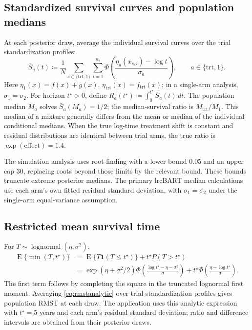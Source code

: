 \documentclass[11pt]{article}
\newcommand{\E}{\operatorname{E}}
\newcommand{\ind}{\mathbf{1}}
\theoremstyle{remark}\newtheorem{remark}{Remark}[section]
\begin{document}
\subsection{Standardized survival curves and population medians}\label{sec:D.3}
At each posterior draw, average the individual survival curves over the trial standardization profiles:
\begin{equation}
\bar S_a(t)\coloneqq \frac{1}N\sum_{s\in\{\mathrm{trt},1\}}\sum_{i=1}^{n_s}\Phi\left(\frac{\eta_a(x_{s,i})-\log t}{\sigma_a}\right),\qquad a\in\{\mathrm{trt},1\}.
\end{equation}
Here $\eta_{1}(x)=f(x)+g(x)$, $\eta_{\mathrm{trt}}(x)=f_{\mathrm{trt}}(x)$; in a single-arm analysis, $\sigma_{1}=\sigma_{2}$. For horizon $t^\star>0$, define $R_a(t^\star)\coloneqq\int_0^{t^\star}\bar S_a(t)\,dt$. The population median $M_a$ solves $\bar S_a(M_a)=1/2$; the median-survival ratio is $M_{\mathrm{trt}}/M_{1}$. This median of a mixture generally differs from the mean or median of the individual conditional medians. When the true log-time treatment shift is constant and residual distributions are identical between trial arms, the true ratio is $\exp(\mathrm{effect})=1.4$.

The simulation analysis uses root-finding with a lower bound 0.05 and an upper cap 30, replacing roots beyond those limits by the relevant bound. These bounds truncate extreme posterior medians. The primary lrcBART median calculations use each arm's own fitted residual standard deviation, with $\sigma_{1}=\sigma_{2}$ under the single-arm equal-variance assumption.

\subsection{Restricted mean survival time}\label{sec:D.4}
For $T\sim\operatorname{lognormal}(\eta,\sigma^2)$,
\begin{equation}\label{eq:rmstanalytic}
\begin{aligned}
\E\{\min(T,t^\star)\}
&=\E\{T\ind(T\leq t^\star)\}+t^\star P(T>t^\star)\\
&=\exp(\eta+\sigma^2/2)\Phi\left(\frac{\log t^\star-\eta-\sigma^2}{\sigma}\right)
+t^\star\Phi\left(\frac{\eta-\log t^\star}{\sigma}\right).
\end{aligned}
\end{equation}
The first term follows by completing the square in the truncated lognormal first moment. Averaging \eqref{eq:rmstanalytic} over trial standardization profiles gives population RMST at each draw. The application uses this analytic expression with $t^\star=5$ years and each arm's residual standard deviation; ratio and difference intervals are obtained from their posterior draws.
\end{document}
